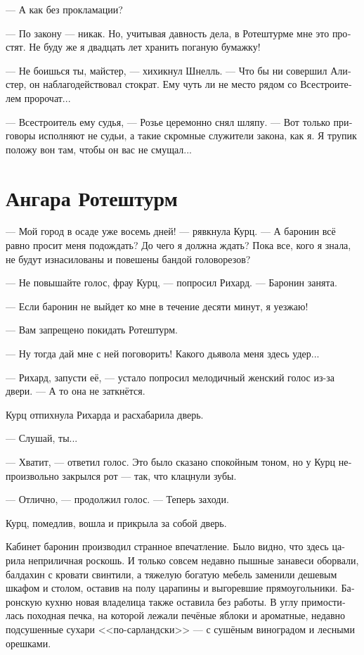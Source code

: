 \documentclass[a4paper,12pt,fleqn]{book}\usepackage{cooltooltips}\usepackage{polyglossia}\setdefaultlanguage[babelshorthands=true]{russian}\setotherlanguage{english}\defaultfontfeatures{Ligatures=TeX,Mapping=tex-text} \usepackage{xcolor}\definecolor{lightgray}{HTML}{bbbbbb}\color{lightgray}\newcommand{\ml}[3]{\textenglish{\textcolor{black}{#3}}}
\begin{document}
--- А как без прокламации?

--- По закону --- никак.
Но, учитывая давность дела, в Ротештурме мне это простят.
Не буду же я двадцать лет хранить поганую бумажку!

--- Не боишься ты, майстер, --- хихикнул Шнелль.
--- Что бы ни совершил Алистер, он наблагодействовал стократ.
Ему чуть ли не место рядом со Всестроителем пророчат...

--- Всестроитель ему судья, --- Розье церемонно снял шляпу.
--- Вот только приговоры исполняют не судьи, а такие скромные служители закона, как я.
Я трупик положу вон там, чтобы он вас не смущал...

\section{Ангара Ротештурм}

--- Мой город в осаде уже восемь дней! --- рявкнула Курц.
--- А баронин всё равно просит меня подождать?
До чего я должна ждать?
Пока все, кого я знала, не будут изнасилованы и повешены бандой головорезов?

--- Не повышайте голос, фрау Курц, --- попросил Рихард.
--- Баронин занята. 

--- Если баронин не выйдет ко мне в течение десяти минут, я уезжаю!

--- Вам запрещено покидать Ротештурм.

--- Ну тогда дай мне с ней поговорить!
Какого дьявола меня здесь удер...

--- Рихард, запусти её, --- устало попросил мелодичный женский голос из-за двери.
--- А то она не заткнётся.

Курц отпихнула Рихарда и расхабарила дверь.

--- Слушай, ты...

--- Хватит, --- ответил голос.
Это было сказано спокойным тоном, но у Курц непроизвольно закрылся рот --- так, что клацнули зубы.

--- Отлично, --- продолжил голос.
--- Теперь заходи.

Курц, помедлив, вошла и прикрыла за собой дверь.

Кабинет баронин производил странное впечатление.
Было видно, что здесь царила неприличная роскошь.
И только совсем недавно пышные занавеси оборвали, балдахин с кровати свинтили, а тяжелую богатую мебель заменили дешевым шкафом и столом, оставив на полу царапины и выгоревшие прямоугольники.
Баронскую кухню новая владелица также оставила без работы.
В углу примостилась походная печка, на которой лежали печёные яблоки и ароматные, недавно подсушенные сухари <<по-сарландски>> --- с сушёным виноградом и лесными орешками.
\end{document}
